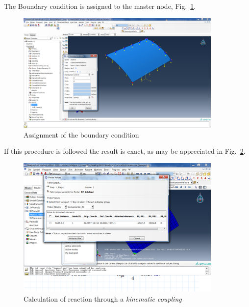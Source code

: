 \documentclass[english,a4paper,12pt]{article}
\begin{document}
The Boundary condition is assigned to the master node, Fig.~\ref{fig:asig-cond-cont}.
\begin{figure}[!htp]
\centering
\includegraphics[width=0.9\textwidth]{fm/Fig-8_BC_Nodo_Maestro.png}
\caption{Assignment of the boundary condition}
\label{fig:asig-cond-cont}
\end{figure}

If this procedure is followed the result is exact, as may be appreciated in Fig.~\ref{fig:calc-reak-kinem}.
\begin{figure}[!htp]
\centering
\includegraphics[width=0.9\textwidth]{fm/Fig-9_Kinematic_Reacc_Vertical.png}
\caption{Calculation of reaction through a \emph{kinematic coupling}}
\label{fig:calc-reak-kinem}
\end{figure}
\end{document}
